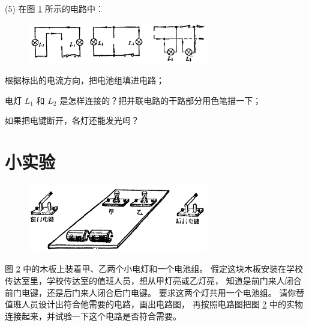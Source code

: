 (5) 在图 \ref{fig:7-29} 所示的电路中：

\begin{figure}[htbp]
    \centering
    \includegraphics[width=0.7\textwidth]{../pic/czwl2-ch7-29}
    \caption{}\label{fig:7-29}
\end{figure}

 根据标出的电流方向，把电池组填进电路；

 电灯 $L_1$ 和 $L_2$ 是怎样连接的？把并联电路的干路部分用色笔描一下；

 如果把电键断开，各灯还能发光吗？



\section*{小实验}

\begin{figure}[htbp]
    \centering
    \includegraphics[width=0.7\textwidth]{../pic/czwl2-ch7-30}
    \caption{}\label{fig:7-30}
\end{figure}

图 \ref{fig:7-30} 中的木板上装着甲、乙两个小电灯和一个电池组。
假定这块木板安装在学校传达室里，学校传达室的值班人员，想从甲灯亮或乙灯亮，
知道是前门来人闭合前门电键，还是后门来人闭合后门电键。
要求这两个灯共用一个电池组。
请你替值班人员设计出符合他需要的电路，画出电路图，
再按照电路图把图 \ref{fig:7-30} 中的实物连接起来，并试验一下这个电路是否符合需要。

